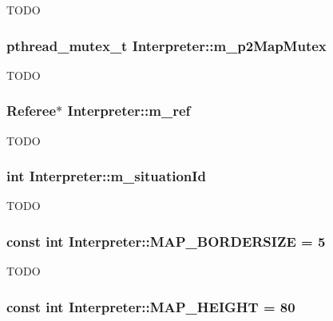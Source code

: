 \label{classInterpreter_a9704ad86fdf8eddecfe191d8540fb4ef}
TODO \hypertarget{classInterpreter_a76012913dbff07096d081b2380c2c7a8}{
\subsubsection[{m\_\-p2MapMutex}]{\setlength{\rightskip}{0pt plus 5cm}pthread\_\-mutex\_\-t {\bf Interpreter::m\_\-p2MapMutex}}}
\label{classInterpreter_a76012913dbff07096d081b2380c2c7a8}
TODO \hypertarget{classInterpreter_a883b74196b1cf25fc6461642c62bc4ec}{
\subsubsection[{m\_\-ref}]{\setlength{\rightskip}{0pt plus 5cm}Referee$\ast$ {\bf Interpreter::m\_\-ref}}}
\label{classInterpreter_a883b74196b1cf25fc6461642c62bc4ec}
TODO \hypertarget{classInterpreter_abe055996cec8f18725f3efb89e7e6ecb}{
\subsubsection[{m\_\-situationId}]{\setlength{\rightskip}{0pt plus 5cm}int {\bf Interpreter::m\_\-situationId}}}
\label{classInterpreter_abe055996cec8f18725f3efb89e7e6ecb}
TODO \hypertarget{classInterpreter_a0e360d1c91a1328af41fd9a4ede5eaef}{
\subsubsection[{MAP\_\-BORDERSIZE}]{\setlength{\rightskip}{0pt plus 5cm}const int {\bf Interpreter::MAP\_\-BORDERSIZE} = 5}}
\label{classInterpreter_a0e360d1c91a1328af41fd9a4ede5eaef}
TODO \hypertarget{classInterpreter_abda6b21064d50acd844bda3ed551e263}{
\subsubsection[{MAP\_\-HEIGHT}]{\setlength{\rightskip}{0pt plus 5cm}const int {\bf Interpreter::MAP\_\-HEIGHT} = 80}}
